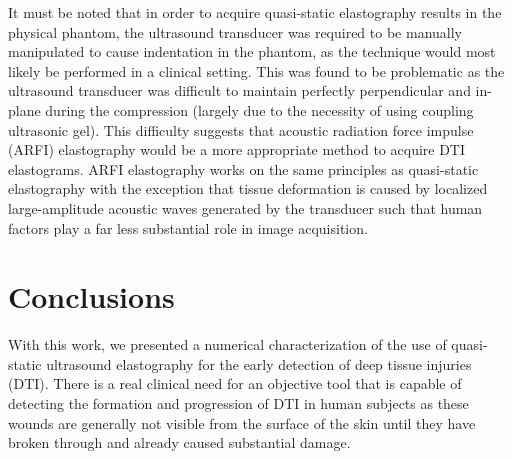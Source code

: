			It must be noted that in order to acquire quasi-static elastography results in the physical phantom, the ultrasound transducer was required to be manually manipulated to cause indentation in the phantom, as the technique would most likely be performed in a clinical setting. This was found to be problematic as the ultrasound transducer was difficult to maintain perfectly perpendicular and in-plane during the compression (largely due to the necessity of using coupling ultrasonic gel). This difficulty suggests that acoustic radiation force impulse (ARFI) elastography would be a more appropriate method to acquire DTI elastograms. ARFI elastography works on the same principles as quasi-static elastography with the exception that tissue deformation is caused by localized large-amplitude acoustic waves generated by the transducer such that human factors play a far less substantial role in image acquisition.

	\section{Conclusions}
		With this work, we presented a numerical characterization of the use of quasi-static ultrasound elastography for the early detection of deep tissue injuries (DTI). There is a real clinical need for an objective tool that is capable of detecting the formation and progression of DTI in human subjects as these wounds are generally not visible from the surface of the skin until they have broken through and already caused substantial damage.

